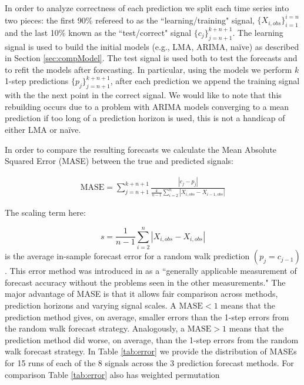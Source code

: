 \documentclass{article}
\begin{document}



In order to analyze correctness of each prediction we split each time series
into two pieces: the first 90\% refereed to as the ``learning/training" signal,
$\{X_{i,obs}\}_{i=1}^{i=n}$ and the last 10\% known as the ``test/correct"
signal $\{c_j\}_{j=n+1}^{k+n+1}$. The learning signal is used to build the
initial models (e.g., LMA, ARIMA, na\"ive) as described in Section
\ref{sec:compModel}. The test signal is used both to test the forecasts and to
refit the models after forecasting. In particular, using the models we perform
$k$ 1-step predictions $\{p_j\}_{j=n+1}^{k+n+1}$, after each prediction we
append the training signal with the the next point in the correct signal. We
would like to note that this rebuilding occurs due to a problem with ARIMA
models converging to a mean prediction if too long of a prediction horizon is
used, this is not a handicap of either LMA or na\"ive.

In order to compare the resulting forecasts we calculate the Mean Absolute
Squared Error (MASE)\cite{MASE} between the true and predicted signals:

\begin{align*}
  \textrm{MASE} = \sum_{j=n+1}^{k+n+1}\frac{|c_j-p_j| }{\frac{k}{n-1}\sum^n_{i=2}|X_{i,obs}-X_{i-1,obs}|}
\end{align*}

The scaling term here:


$$s=\frac{1}{n-1}\sum^n_{i=2}|X_{i,obs}-X_{i,obs}|$$ is the average in-sample
forecast error for a random walk prediction $(p_j=c_{j-1})$. This error method
was introduced in \cite{MASE} as a ``generally applicable measurement of
forecast accuracy without the problems seen in the other measurements." The
major advantage of MASE is that it allows fair comparison across methods,
prediction horizons and varying signal scales. A $\textrm{MASE}<1$ means that
the prediction method gives, on average, smaller errors than the 1-step errors
from the random walk forecast strategy. Analogously, a $\textrm{MASE}>1$ means
that the prediction method did worse, on average, than the 1-step errors from the
random walk forecast strategy. In Table \ref{tab:error} we provide the
distribution of MASEs for 15 runs of each of the 8 signals across the 3
prediction forecast methods. For comparison Table \ref{tab:error} also has
weighted permutation
\end{document}
